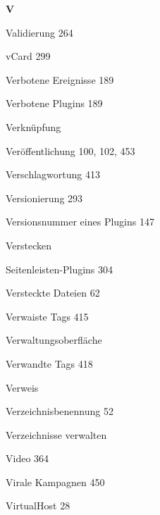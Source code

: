 \documentclass{book}
\renewcommand\indexspace{\vspace{11pt}}
\renewcommand\subitem{\par}
\begin{document}
\begin{multicols}{2}
\begin{osp-index}
  \indexspace
{\sffamily\bfseries V}\nopagebreak

  \item Validierung\hspace{1mm} 264
  \item vCard\hspace{1mm} 299
  \item Verbotene Ereignisse\hspace{1mm} 189
  \item Verbotene Plugins\hspace{1mm} 189
  \item Verkn\"upfung\hspace{1mm} 
  \item Ver\"offentlichung\hspace{1mm} 100, 102, 453
  \item Verschlagwortung\hspace{1mm} 413
  \item Versionierung\hspace{1mm} 293
  \item Versionsnummer eines Plugins\hspace{1mm} 147
  \item Verstecken
    \subitem Seitenleisten-Plugins\hspace{1mm} 304
  \item Versteckte Dateien\hspace{1mm} 62
  \item Verwaiste Tags\hspace{1mm} 415
  \item Verwaltungsoberfl\"ache\hspace{1mm} 
  \item Verwandte Tags\hspace{1mm} 418
  \item Verweis\hspace{1mm} 
  \item Verzeichnisbenennung\hspace{1mm} 52
  \item Verzeichnisse verwalten\hspace{1mm} 
  \item Video\hspace{1mm} 364
  \item Virale Kampagnen\hspace{1mm} 450
  \item VirtualHost\hspace{1mm} 28

\end{osp-index}
\end{multicols}
\end{document}
